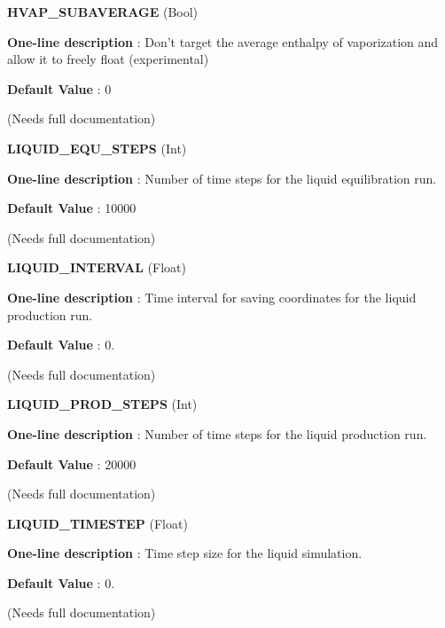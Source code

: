\begin{DoxyItemize}
\item {\bfseries  H\-V\-A\-P\-\_\-\-S\-U\-B\-A\-V\-E\-R\-A\-G\-E } (Bool) \par
{\bfseries  One-\/line description }\-: Don't target the average enthalpy of vaporization and allow it to freely float (experimental) \par
{\bfseries  Default Value }\-: 0 \par
(Needs full documentation)\end{DoxyItemize}
\begin{DoxyItemize}
\item {\bfseries  L\-I\-Q\-U\-I\-D\-\_\-\-E\-Q\-U\-\_\-\-S\-T\-E\-P\-S } (Int) \par
{\bfseries  One-\/line description }\-: Number of time steps for the liquid equilibration run. \par
{\bfseries  Default Value }\-: 10000 \par
(Needs full documentation)\end{DoxyItemize}
\begin{DoxyItemize}
\item {\bfseries  L\-I\-Q\-U\-I\-D\-\_\-\-I\-N\-T\-E\-R\-V\-A\-L } (Float) \par
{\bfseries  One-\/line description }\-: Time interval for saving coordinates for the liquid production run. \par
{\bfseries  Default Value }\-: 0. \par
(Needs full documentation)\end{DoxyItemize}
\begin{DoxyItemize}
\item {\bfseries  L\-I\-Q\-U\-I\-D\-\_\-\-P\-R\-O\-D\-\_\-\-S\-T\-E\-P\-S } (Int) \par
{\bfseries  One-\/line description }\-: Number of time steps for the liquid production run. \par
{\bfseries  Default Value }\-: 20000 \par
(Needs full documentation)\end{DoxyItemize}
\begin{DoxyItemize}
\item {\bfseries  L\-I\-Q\-U\-I\-D\-\_\-\-T\-I\-M\-E\-S\-T\-E\-P } (Float) \par
{\bfseries  One-\/line description }\-: Time step size for the liquid simulation. \par
{\bfseries  Default Value }\-: 0. \par
(Needs full documentation)\end{DoxyItemize}

